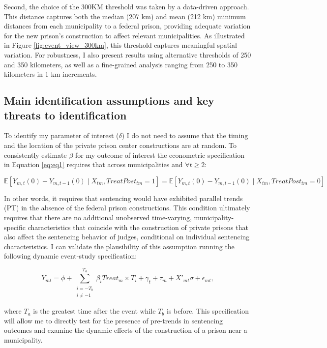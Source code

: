 Second, the choice of the 300KM threshold was taken by a data-driven approach. This distance captures both the median (207 km) and mean (212 km) minimum distances from each municipality to a federal prison, providing adequate variation for the new prison’s construction to affect relevant municipalities. As illustrated in Figure \ref{fig:event_view_300km}, this threshold captures meaningful spatial variation. For robustness, I also present results using alternative thresholds of 250 and 350 kilometers, as well as a fine-grained analysis ranging from 250 to 350 kilometers in 1 km increments.

\subsection*{Main identification assumptions and key threats to identification}

To identify my parameter of interest ($\delta$) I do not need to assume that the timing and the location of the private prison center constructions are at random. To consistently estimate $\beta$ for my outcome of interest the econometric specification in Equation \ref{eq:eq1} requires that across municipalities and $\forall t\geq2$: 

\begin{equation}
\mathbb{E}[Y_{m,t}(0) - Y_{m,t-1}(0) \mid X_{tm}, TreatPost_{tm} = 1] = 
\mathbb{E}[Y_{m,t}(0) - Y_{m,t-1}(0) \mid X_{tm}, TreatPost_{tm} = 0]
\end{equation}

In other words, it requires that sentencing would have exhibited parallel trends (PT) in the absence of the federal prison constructions. This condition ultimately requires that there are no additional unobserved time-varying, municipality-specific characteristics that coincide with the construction of private prisons that also affect the sentencing behavior of judges, conditional on individual sentencing characteristics. I can validate the plausibility of this assumption running the following dynamic event-study specification: 

\begin{equation}
\label{eq:eq2}
    Y_{mt} = \phi + \sum_{\substack{i=-T_b \\ i\neq -1}}^{T_{a}} {\beta_{i}} Treat_{m}\times T_{i} + \gamma_t + \tau_m + X'_{mt}\sigma + \epsilon_{mt},
\end{equation}

where $T_{a}$ is the greatest time after the event while $T_{b}$ is before. This specification will allow me to directly test for the presence of pre-trends in sentencing outcomes and examine the dynamic effects of the construction of a prison near a municipality.

